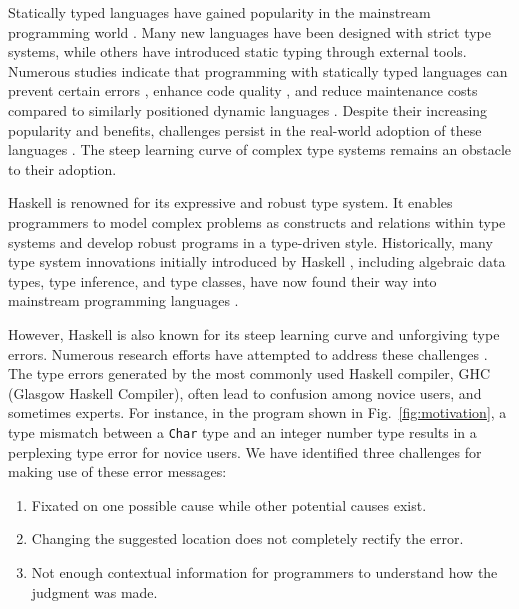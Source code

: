 Statically typed languages have gained popularity in the mainstream programming world \cite{StackOverflow2022-aw}. Many new languages have been designed with strict type systems, while others have introduced static typing through external tools. Numerous studies indicate that programming with statically typed languages can prevent certain errors \cite{Bogner2022-vf}, enhance code quality \cite{Mayer2012-lg}, and reduce maintenance costs \cite{Kleinschmager2012-bg} compared to similarly positioned dynamic languages \cite{Bogner2022-vf}. Despite their increasing popularity and benefits, challenges persist in the real-world adoption of these languages \cite{Zeng2019-ou}. The steep learning curve of complex type systems remains an obstacle to their adoption. 

Haskell is renowned for its expressive and robust type system. It enables programmers to model complex problems as constructs and relations within type systems and develop robust programs in a type-driven style. Historically, many type system innovations initially introduced by Haskell \cite{Hudak2007-kn}, including algebraic data types, type inference, and type classes, have now found their way into mainstream programming languages \cite{TypeScriptTeam_undated-qk,Klabnik_undated-mp,Griesemer_undated-ff}.
    
However, Haskell is also known for its steep learning curve and unforgiving type errors. Numerous research efforts have attempted to address these challenges \cite{Tirronen2015-nr,Chen2014-dz, Heeren2003-kd,Zhang2015-xy, Lerner2007-mu,Zhang2017-tj}. The type errors generated by the most commonly used Haskell compiler, GHC (Glasgow Haskell Compiler), often lead to confusion among novice users, and sometimes experts. For instance, in the program shown in Fig.~\ref{fig:motivation}, a type mismatch between a {\tt Char} type and an integer number type results in a perplexing type error for novice users. We have identified three challenges for making use of these error messages:


    \begin{enumerate}
        \item Fixated on one possible cause while other potential causes exist.
        \item Changing the suggested location does not completely rectify the error.
        \item Not enough contextual information for programmers to understand how the judgment was made.

    \end{enumerate}


